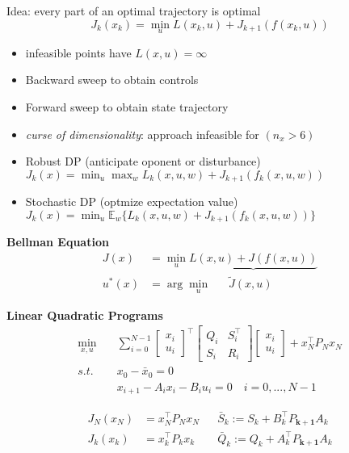 
\begin{tcolorbox}[colback=yellow!5!white,colframe=yellow!75!black,title=\textbf{Dynamic Programming}]
	Idea: every part of an optimal trajectory is optimal
	\begin{equation*}
	J_k(x_k) = \min_u L(x_k, u) + J_{k+1}(f(x_k, u))
	\end{equation*}
	\begin{itemize}
		\item infeasible points have $L(x,u) = \infty$
		\item Backward sweep to obtain controls
		\item Forward sweep to obtain state trajectory
		\item \textit{curse of dimensionality}: approach infeasible for $(n_x>6)$
		\item Robust DP (anticipate oponent or disturbance)\\
		$J_k(x) = \min_u \max_w L_k(x,u,w) + J_{k+1}(f_k(x,u,w))$
		\item Stochastic DP (optmize expectation value)\\
		$J_k(x) = \min_u \mathbb{E}_w\{ L_k(x,u,w) + J_{k+1}(f_k(x,u,w)) \}$\\
	\end{itemize}

	\textbf{Bellman Equation}
	\begin{align*}
		J(x) &= \min_u \underbrace{L(x,u) + J(f(x, u))}\\
		u^*(x) &= \arg \min_u \quad \;\; \tilde{J}(x, u)
	\end{align*}
	
	
	\textbf{Linear Quadratic Programs}
	\begin{align*}
		\min_{x,u}\quad&
		\sum_{i=0}^{N-1}
		\begin{bmatrix}
			x_i\\ u_i
		\end{bmatrix}^\top
		\begin{bmatrix}
			Q_i & S_i^\top\\ S_i & R_i
		\end{bmatrix}
	\begin{bmatrix}
		x_i\\ u_i
	\end{bmatrix}
	+
	x_N^\top P_N x_N\\
	s.t.\quad&
	x_0 - \bar{x}_0 = 0\\
	&x_{i+1} - A_i x_i - B_i u_i = 0 \quad i = 0, ..., N-1
	\end{align*}

	\begin{align*}
		J_N(x_N) &= x_N^\top P_N x_N && \bar{S}_k := S_k + B_k^\top P_{\mathbf{k+1}} A_k\\
		J_k(x_k) &= x_k^\top P_k x_k &&  \bar{Q}_k := Q_k + A_k^\top P_{\mathbf{k+1}} A_k
	\end{align*}\\
  

\end{tcolorbox}
